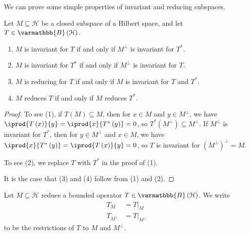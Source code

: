 \documentclass[10pt]{mypackage}
\renewcommand*{\mathbb}[1]{\varmathbb{#1}}
\newcommand{\B}{\mathbb{B}}
\begin{document}
We can prove some simple properties of invariant and reducing subspaces.
\begin{lemma}
  Let $M\subseteq \mathcal{H}$ be a closed subspace of a Hilbert space, and let $T\in \B\left(\mathcal{H}\right)$.
  \begin{enumerate}[(1)]
    \item $M$ is invariant for $T$ if and only if $M^{\perp}$ is invariant for $T^{\ast}$.
    \item $M$ is invariant for $T^{\ast}$ if and only if $M^{\perp}$ is invariant for $T$.
    \item $M$ is reducing for $T$ if and only if $M$ is invariant for $T$ and $T^{\ast}$.
    \item $M$ reduces $T$ if and only if $M$ reduces $T^{\ast}$.
  \end{enumerate}
\end{lemma}
\begin{proof}
  To see (1), if $T\left(M\right)\subseteq M$, then for $x\in M$ and $y\in M^{\perp}$, we have $ \iprod{T\left(x\right)}{y} = \iprod{x}{T^{\ast}\left(y\right)} = 0 $, so $T^{\ast}\left(M^{\perp}\right)\subseteq M^{\perp}$. If $M^{\perp}$ is invariant for $T^{\ast}$, then for $y\in M^{\perp}$ and $x\in M$, we have $ \iprod{x}{T^{\ast}\left(y\right)} = \iprod{T\left(x\right)}{y} = 0 $, so $T$ is invariant for $\left(M^{\perp}\right)^{\perp} = M$.\newline

  To see (2), we replace $T$ with $T^{\ast}$ in the proof of (1).\newline

  It is the case that (3) and (4) follow from (1) and (2).
\end{proof}
\begin{definition}
  Let $M\subseteq \mathcal{H}$ reduce a bounded operator $T\in \B\left(\mathcal{H}\right)$. We write
  \begin{align*}
    T_M &= T|_{M}\\
    T_{M^{\perp}} &= T|_{M^{\perp}}
  \end{align*}
  to be the restrictions of $T$ to $M$ and $M^{\perp}$.
\end{definition}
\end{document}
